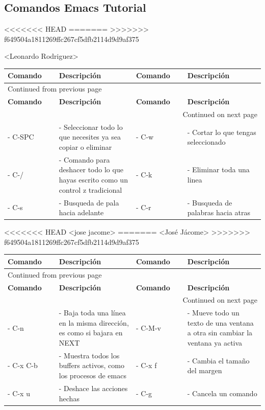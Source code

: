 \documentclass{article}
\begin{document}
\subsection{Comandos Emacs Tutorial}
<<<<<<< HEAD
\label{sec:orgfe197c4}
=======
\label{sec:orgd496646}
>>>>>>> f649504a1811269ffc267cf5dfb2114d9d9af375

<Leonardo Rodriguez>
\begin{longtable}{|p{0.2\linewidth}|p{0.3\linewidth}|p{0.2\linewidth}|p{0.3\linewidth}|}
\textbf{Comando} & \textbf{Descripción} & \textbf{Comando} & \textbf{Descripción}\\[0pt]
\hline
\endfirsthead
\multicolumn{4}{l}{Continued from previous page} \\[0pt]
\hline

\textbf{Comando} & \textbf{Descripción} & \textbf{Comando} & \textbf{Descripción} \\[0pt]

\hline
\endhead
\hline\multicolumn{4}{r}{Continued on next page} \\
\endfoot
\endlastfoot
\hline
- C-SPC & - Seleccionar todo lo que necesites ya sea copiar o eliminar & - C-w & - Cortar lo que tengas seleccionado\\[0pt]
\hline
- C-/ & - Comando para deshacer todo lo que hayas escrito como un control z tradicional & - C-k & - Eliminar toda una linea\\[0pt]
\hline
- C-s & - Busqueda de pala hacia adelante & - C-r & - Busqueda de palabras hacia atras\\[0pt]
\hline
\end{longtable}

<<<<<<< HEAD
<jose jacome>
=======
<José Jácome>
>>>>>>> f649504a1811269ffc267cf5dfb2114d9d9af375
\begin{longtable}{|p{0.2\linewidth}|p{0.3\linewidth}|p{0.2\linewidth}|p{0.3\linewidth}|}
\textbf{Comando} & \textbf{Descripción} & \textbf{Comando} & \textbf{Descripción}\\[0pt]
\hline
\endfirsthead
\multicolumn{4}{l}{Continued from previous page} \\[0pt]
\hline

\textbf{Comando} & \textbf{Descripción} & \textbf{Comando} & \textbf{Descripción} \\[0pt]

\hline
\endhead
\hline\multicolumn{4}{r}{Continued on next page} \\
\endfoot
\endlastfoot
\hline
- C-n & - Baja toda una línea en la misma dirección, es como si bajara en NEXT & - C-M-v & - Mueve todo un texto de una ventana a otra sin cambiar la ventana ya activa\\[0pt]
\hline
- C-x C-b & - Muestra todos los buffers activos, como los procesos de emacs & - C-x f & - Cambia el tamaño del margen\\[0pt]
\hline
- C-x u & - Deshace las acciones hechas & - C-g & - Cancela un comando\\[0pt]
\hline
\end{longtable}
\end{document}
